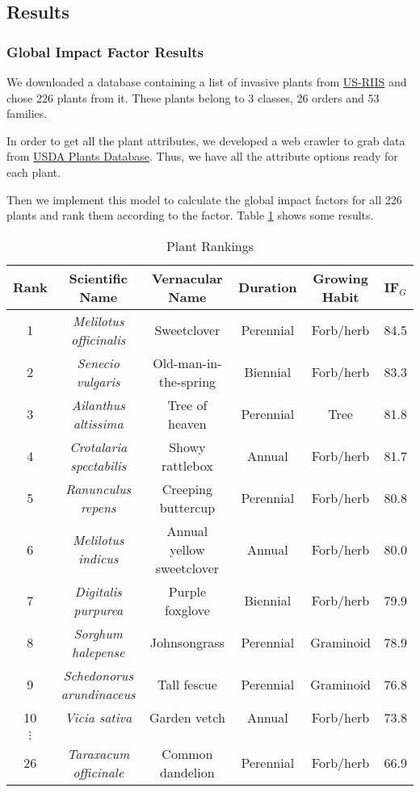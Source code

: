 \documentclass[12pt]{article}
\begin{document}
	\subsection{Results}
	\subsubsection{Global Impact Factor Results}
		
		We downloaded a database containing a list of invasive plants from \href{https://www.sciencebase.gov/catalog/item/5b911a5ce4b0702d0e808588}{US-RIIS}\autocite{US-RIIS} and chose 226 plants from it.  These plants belong to 3 classes, 26 orders and 53 families.
		
		In order to get all the plant attributes, we developed a web crawler to grab data from \href{https://plants.usda.gov/home/}{USDA Plants Database}\autocite{USDA}.  Thus, we have all the attribute options ready for each plant.
		
		Then we implement this model to calculate the global impact factors for all 226 plants and rank them according to the factor.  Table \ref{tb:ranks} shows some results.
		
		{
			\fontsize{10}{14}\selectfont
			{
				\begin{longtable}{cccccc}
					\caption{Plant Rankings}
					\label{tb:ranks}\\
					
					\toprule
					Rank&Scientific Name&Vernacular Name&Duration&Growing Habit&IF$_G$\\
					\toprule
					1&\textit{Melilotus officinalis}&Sweetclover&Perennial&Forb/herb&84.5\\
					2&\textit{Senecio vulgaris}&Old-man-in-the-spring&Biennial&Forb/herb&83.3\\
					3&\textit{Ailanthus altissima}&Tree of heaven&Perennial&Tree&81.8\\
					4&\textit{Crotalaria spectabilis}&Showy rattlebox&Annual&Forb/herb&81.7\\
					5&\textit{Ranunculus repens}&Creeping buttercup&Perennial&Forb/herb&80.8\\
					6&\textit{Melilotus indicus}&Annual yellow sweetclover&Annual&Forb/herb&80.0\\
					7&\textit{Digitalis purpurea}&Purple foxglove&Biennial&Forb/herb&79.9\\
					8&\textit{Sorghum halepense}&Johnsongrass&Perennial&Graminoid&78.9\\
					9&\textit{Schedonorus arundinaceus}&Tall fescue&Perennial&Graminoid&76.8\\
					10&\textit{Vicia sativa}&Garden vetch&Annual&Forb/herb&73.8\\
					$\vdots$\\
					26&\textit{Taraxacum officinale}&Common dandelion&Perennial&Forb/herb&66.9\\
					\bottomrule
				\end{longtable}
			}
		}
		
\end{document}
